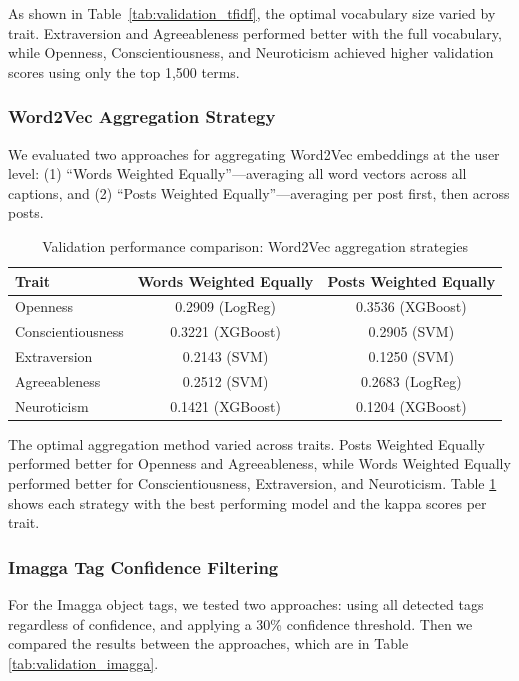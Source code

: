As shown in Table~\ref{tab:validation_tfidf}, the optimal vocabulary size varied by trait. Extraversion and Agreeableness performed better with the full vocabulary, while Openness, Conscientiousness, and Neuroticism achieved higher validation scores using only the top 1,500 terms.

\subsubsection{Word2Vec Aggregation Strategy}

We evaluated two approaches for aggregating Word2Vec embeddings at the user level: (1) ``Words Weighted Equally''---averaging all word vectors across all captions, and (2) ``Posts Weighted Equally''---averaging per post first, then across posts. 

\begin{table}[H]
	\centering
	\caption{Validation performance comparison: Word2Vec aggregation strategies}
	\label{tab:validation_word2vec}
	\begin{tabular}{lcc}
		\hline
		\textbf{Trait} & \textbf{Words Weighted Equally} & \textbf{Posts Weighted Equally} \\
		\hline
		Openness          & 0.2909 (LogReg)  & 0.3536 (XGBoost) \\
		Conscientiousness & 0.3221 (XGBoost) & 0.2905 (SVM)     \\
		Extraversion      & 0.2143 (SVM)     & 0.1250 (SVM)     \\
		Agreeableness     & 0.2512 (SVM)     & 0.2683 (LogReg)  \\
		Neuroticism       & 0.1421 (XGBoost) & 0.1204 (XGBoost) \\
		\hline
	\end{tabular}
\end{table}

The optimal aggregation method varied across traits. Posts Weighted Equally performed better for Openness and Agreeableness, while Words Weighted Equally performed better for Conscientiousness, Extraversion, and Neuroticism. Table \ref{tab:validation_word2vec} shows each strategy with the best performing model and the kappa scores per trait.

\subsubsection{Imagga Tag Confidence Filtering}

For the Imagga object tags, we tested two approaches: using all detected tags regardless of confidence, and applying a 30\% confidence threshold. Then we compared the results between the approaches, which are in Table \ref{tab:validation_imagga}.

